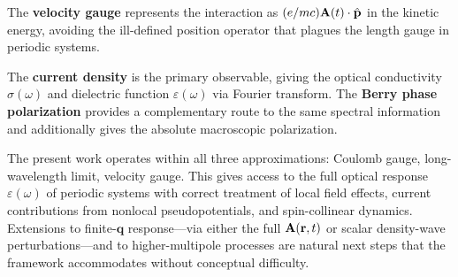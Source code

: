 The \textbf{velocity gauge} represents the interaction as
$(e/mc)\mathbf{A}(t)\cdot\hat{\mathbf{p}}$ in the kinetic energy, avoiding the
ill-defined position operator that plagues the length gauge in
periodic systems.

The \textbf{current density} is the primary observable, giving the
optical conductivity $\sigma(\omega)$ and dielectric function
$\varepsilon(\omega)$ via Fourier transform.
The \textbf{Berry phase polarization} provides a complementary route
to the same spectral information and additionally gives the absolute
macroscopic polarization.

The present work operates within all three approximations: Coulomb
gauge, long-wavelength limit, velocity gauge.
This gives access to the full optical response $\varepsilon(\omega)$
of periodic systems with correct treatment of local field effects,
current contributions from nonlocal pseudopotentials, and
spin-collinear dynamics.
Extensions to finite-$\mathbf{q}$ response---via either the full
$\mathbf{A}(\mathbf{r},t)$ or scalar density-wave perturbations---and to
higher-multipole processes are natural next steps that the framework
accommodates without conceptual difficulty.
